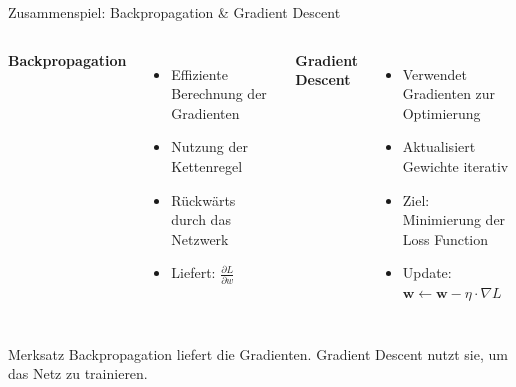\begin{frame}{Zusammenspiel: Backpropagation \& Gradient Descent}
\par\medskip
\begin{columns}
\textbf{Backpropagation}
\begin{itemize}
\item Effiziente Berechnung der Gradienten
\item Nutzung der Kettenregel
\item Rückwärts durch das Netzwerk
\item Liefert: $\frac{\partial L}{\partial w}$
\end{itemize}

\textbf{Gradient Descent}
\begin{itemize}
\item Verwendet Gradienten zur Optimierung
\item Aktualisiert Gewichte iterativ
\item Ziel: Minimierung der Loss Function
\item Update: $\mathbf{w} \leftarrow \mathbf{w} - \eta \cdot \nabla L$
\end{itemize}
\end{columns}

\vspace{1em}
\begin{block}{Merksatz}
Backpropagation liefert die Gradienten. Gradient Descent nutzt sie, um das Netz zu trainieren.
\end{block}
\end{frame}

